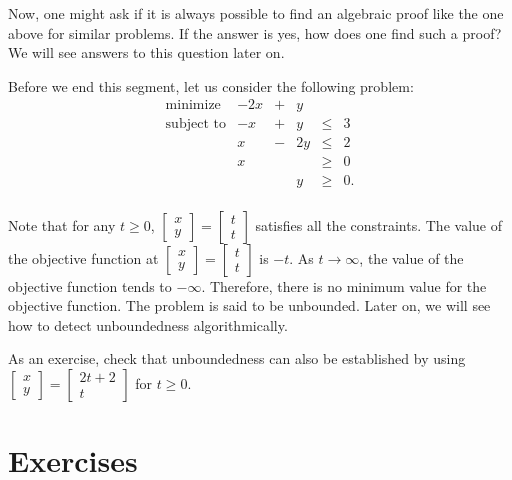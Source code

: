 \documentclass[]{book}
\theoremstyle{definition}
\theoremstyle{definition}
\theoremstyle{remark}
\begin{document}
Now, one might ask if it is always possible to find an algebraic proof
like the one above for similar problems. If the answer is yes, how does
one find such a proof? We will see answers to this question later on.

Before we end this segment, let us consider the following problem:
\[\begin{array}{rrcrll}
\mbox{minimize } & -2x & + & y & \\
\mbox{subject to} & -x & + & y & \leq & 3 \\
& x & - &  2y & \leq & 2 \\
& x &  & & \geq & 0 \\
& & & y & \geq & 0. \\
\end{array}\]

Note that for any \(t \geq 0\),
\(\begin{bmatrix} x \\ y\end{bmatrix} = \begin{bmatrix} t \\ t\end{bmatrix}\)
satisfies all the constraints. The value of the objective function at
\(\begin{bmatrix} x \\ y\end{bmatrix} = \begin{bmatrix} t \\ t\end{bmatrix}\)
is \(-t\). As \(t \rightarrow \infty\), the value of the objective
function tends to \(-\infty\). Therefore, there is no minimum value for
the objective function. The problem is said to be unbounded. Later on,
we will see how to detect unboundedness algorithmically.

As an exercise, check that unboundedness can also be established by
using
\(\begin{bmatrix} x \\ y\end{bmatrix} = \begin{bmatrix} 2t+2 \\ t\end{bmatrix}\)
for \(t \geq 0\).

\section*{Exercises}\label{exercises}
\end{document}

